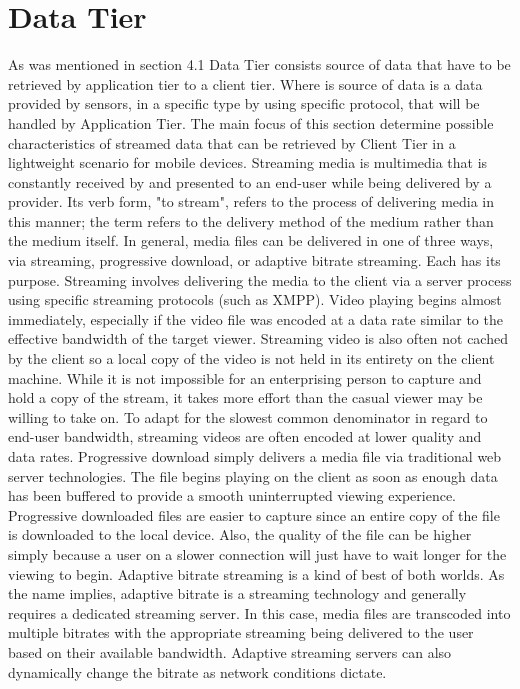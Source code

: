 \section{Data Tier}
   As was mentioned in section 4.1 Data Tier consists source of data that have to be retrieved by application tier to a client tier. Where is source of data is a data provided by sensors, in a specific type by using specific protocol, that will be handled by Application Tier. The main focus of this section determine possible characteristics of streamed data that can be retrieved by Client Tier in a lightweight scenario for mobile devices.
   \newline
    Streaming media is multimedia that is constantly received by and presented to an end-user while being delivered by a provider. Its verb form, "to stream", refers to the process of delivering media in this manner; the term refers to the delivery method of the medium rather than the medium itself. In general, media files can be delivered in one of three ways, via streaming, progressive download, or adaptive bitrate streaming.  Each has its purpose.
  \newline
    Streaming involves delivering the media to the client via a server process using specific streaming protocols (such as XMPP).  Video playing begins almost immediately, especially if the video file was encoded at a data rate similar to the effective bandwidth of the target viewer.  Streaming video is also often not cached by the client so a local copy of the video is not held in its entirety on the client machine.  While it is not impossible for an enterprising person to capture and hold a copy of the stream, it takes more effort than the casual viewer may be willing to take on.  To adapt for the slowest common denominator in regard to end-user bandwidth, streaming videos are often encoded at lower quality and data rates.
  \newline
    Progressive download simply delivers a media file via traditional web server technologies.  The file begins playing on the client as soon as enough data has been buffered to provide a smooth uninterrupted viewing experience.  Progressive downloaded files are easier to capture since an entire copy of the file is downloaded to the local device.  Also, the quality of the file can be higher simply because a user on a slower connection will just have to wait longer for the viewing to begin.
  \newline
    Adaptive bitrate streaming is a kind of best of both worlds.  As the name implies, adaptive bitrate is a streaming technology and generally requires a dedicated streaming server.  In this case, media files are transcoded into multiple bitrates with the appropriate streaming being delivered to the user based on their available bandwidth.  Adaptive streaming servers can also dynamically change the bitrate as network conditions dictate\cite{ilias2013study}.
